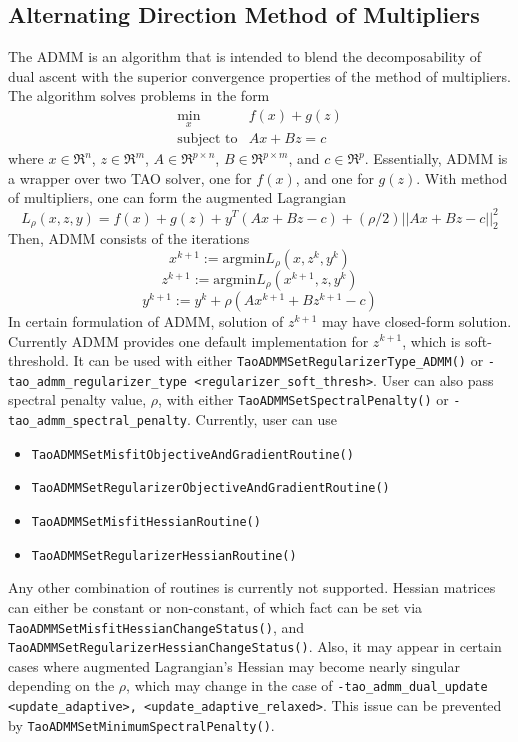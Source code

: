 \subsection{Alternating Direction Method of Multipliers}

The ADMM is an algorithm that is intended to blend the decomposability
of dual ascent with the superior convergence properties of the
method of multipliers. \cite{boyd} 
The algorithm solves problems in the form
\[
\begin{array}{ll}
\displaystyle \min_{x} & f(x) + g(z) \\ 
\mbox{subject to} & Ax + Bz = c
\end{array}
\]
where $x \in \Re^n$, $z \in \Re^m$, $A \in \Re^{p \times n}$, $B \in \Re^{p \times m}$, and $c \in \Re^p$.
Essentially, ADMM is a wrapper over two TAO solver, one for $f(x)$, and one for $g(z)$.
With method of multipliers, one can form the augmented Lagrangian 
\begin{equation}
L_{\rho}(x,z,y) = f(x) + g(z) + y^T(Ax+Bz-c) + (\rho/2)||Ax+Bz-c||_2^2
\end{equation}
Then, ADMM consists of the iterations
\begin{equation}
x^{k+1} := \text{argmin}L_{\rho}(x,z^k,y^k)
\end{equation}
\begin{equation}
z^{k+1} := \text{argmin}L_{\rho}(x^{k+1},z,y^k)
\end{equation}
\begin{equation}
y^{k+1} := y^k + \rho(Ax^{k+1}+Bz^{k+1}-c)
\end{equation}
In certain formulation of ADMM, solution of $z^{k+1}$ may have closed-form solution. 
Currently ADMM provides one default implementation for $z^{k+1}$, which is soft-threshold. 
It can be used with either {\tt TaoADMMSetRegularizerType\_ADMM()} or
\texttt{-tao\_admm\_regularizer\_type <regularizer\_soft\_thresh>}.
User can also pass spectral penalty value, $\rho$, with either {\tt TaoADMMSetSpectralPenalty()} or
\texttt{-tao\_admm\_spectral\_penalty}.
Currently, user can use
\begin{itemize}
\item {\tt TaoADMMSetMisfitObjectiveAndGradientRoutine()}
\item {\tt TaoADMMSetRegularizerObjectiveAndGradientRoutine()}
\item {\tt TaoADMMSetMisfitHessianRoutine()}
\item {\tt TaoADMMSetRegularizerHessianRoutine()}
\end{itemize}
Any other combination of routines is currently not supported. Hessian matrices can either be constant or non-constant,
of which fact can be set via {\tt TaoADMMSetMisfitHessianChangeStatus()}, and {\tt TaoADMMSetRegularizerHessianChangeStatus()}.
Also, it may appear in certain cases where augmented Lagrangian's Hessian may become nearly singular depending on the 
$\rho$, which may change in the case of \texttt{-tao\_admm\_dual\_update <update\_adaptive>, <update\_adaptive\_relaxed>}.
This issue can be prevented by {\tt TaoADMMSetMinimumSpectralPenalty()}.

